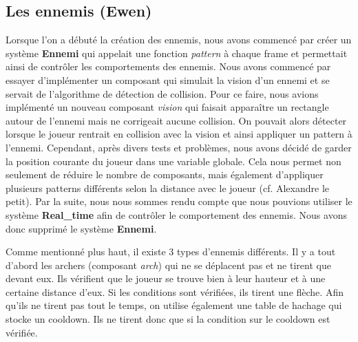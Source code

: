 \documentclass{article}
\begin{document}

\subsection{Les ennemis (Ewen)}
Lorsque l'on a débuté la création des ennemis, nous avons commencé par créer un système \textbf{Ennemi} qui appelait 
une fonction \textit{pattern} à chaque frame et permettait ainsi de contrôler les comportements des ennemis. 
Nous avons commencé par essayer d'implémenter un composant qui simulait la vision d'un ennemi 
et se servait de l'algorithme de détection de collision. Pour ce faire, nous avions implémenté un nouveau composant 
\textit{vision} qui faisait apparaître un rectangle autour de l'ennemi mais ne corrigeait aucune collision. 
On pouvait alors détecter lorsque le joueur rentrait en collision avec la vision et ainsi appliquer un pattern à l'ennemi. 
Cependant, après divers tests et problèmes, nous avons décidé de garder la position courante du joueur dans 
une variable globale. Cela nous permet non seulement de réduire le nombre de composants, mais également d'appliquer plusieurs 
patterns différents selon la distance avec le joueur (cf. Alexandre le petit).
Par la suite, nous nous sommes rendu compte que nous pouvions utiliser le système \textbf{Real\_time} afin de contrôler 
le comportement des ennemis. Nous avons donc supprimé le système \textbf{Ennemi}.

Comme mentionné plus haut, il existe 3 types d'ennemis différents. Il y a tout d'abord les archers (composant \textit{arch})
 qui ne se déplacent pas et ne tirent que devant eux. 
Ils vérifient que le joueur se trouve bien à leur hauteur et à une certaine distance d'eux. Si les conditions sont vérifiées, 
ils tirent une flèche. Afin qu'ils ne tirent pas tout le temps, on utilise également une table de hachage qui stocke un cooldown. 
Ils ne tirent donc que si la condition sur le cooldown est vérifiée.
\end{document}
